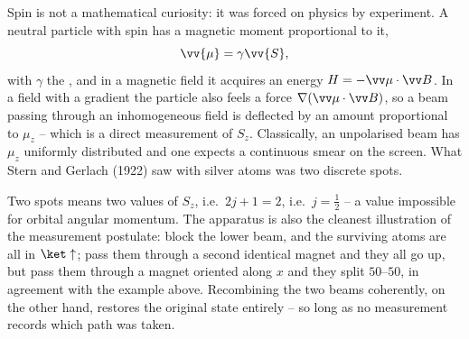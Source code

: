 Spin is not a mathematical curiosity: it was forced on physics by experiment. A neutral particle with spin has a magnetic moment proportional to it,
$$
\vv{\mu} = \gamma \vv{S},
$$
with $\gamma$ the , and in a magnetic field it acquires an energy $H = -\vv\mu\cdot\vv B$. In a field with a gradient the particle also feels a force $\nabla(\vv\mu\cdot\vv B)$, so a beam passing through an inhomogeneous field is deflected by an amount proportional to $\mu_z$ -- which is a direct measurement of $S_z$. Classically, an unpolarised beam has $\mu_z$ uniformly distributed and one expects a continuous smear on the screen. What Stern and Gerlach (1922) saw with silver atoms was two discrete spots.

\begin{center}
\end{center}

Two spots means two values of $S_z$, i.e.\ $2j+1 = 2$, i.e.\ $j = \frac12$ -- a value impossible for orbital angular momentum. The apparatus is also the cleanest illustration of the measurement postulate: block the lower beam, and the surviving atoms are all in $\ket\uparrow$; pass them through a second identical magnet and they all go up, but pass them through a magnet oriented along $x$ and they split $50$--$50$, in agreement with the example above. Recombining the two beams coherently, on the other hand, restores the original state entirely -- so long as no measurement records which path was taken.


